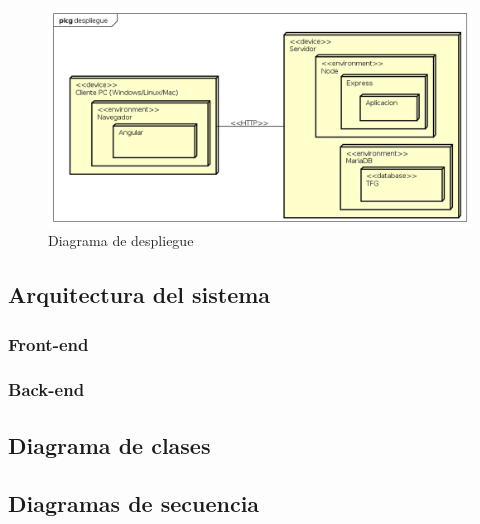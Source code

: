 \documentclass[openright,twoside,10pt]{book}
\begin{document}
    \vspace*{\fill}
    
    \begin{figure}[H]
        \begin{center}
            \includegraphics[width=\textwidth]{img/astah/disenio/despliegue/deployment.png}
        \end{center}
        \caption{Diagrama de despliegue}
    \end{figure}
    
    \vspace*{\fill} \newpage
    
    \subsection{Arquitectura del sistema}\label{arquitectura-del-sistema}
    
    \subsubsection{Front-end}\label{front-end}
    
    \subsubsection{Back-end}\label{back-end}
    
    \subsection{Diagrama de clases}\label{diagrama-de-clases}
    
    \subsection{Diagramas de secuencia}\label{diagramas-de-secuencia}
    
\end{document}
